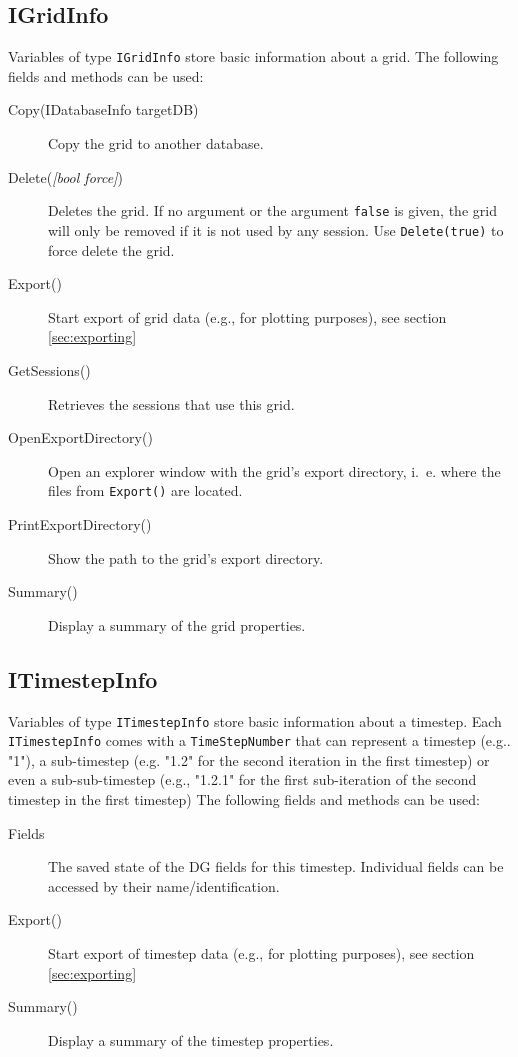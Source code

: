 \subsection{IGridInfo}
Variables of type \lstinline{IGridInfo} store basic information about a grid.
The following fields and methods can be used:
\begin{description}
	\item[Copy(IDatabaseInfo targetDB)]
	Copy the grid to another database.
	
	\item[Delete(\emph{{[}bool force{]}})]
	Deletes the grid. If no argument or the argument \lstinline{false} is given, the grid will only be removed if it is not used by any session. Use \lstinline{Delete(true)} to force delete the grid.
	
	\item[Export()]
	Start export of grid data (e.g., for plotting purposes), see section \ref{sec:exporting}
	
	\item[GetSessions()]
	Retrieves the sessions that use this grid.
	
	\item[OpenExportDirectory()]
	Open an explorer window with the grid's export directory, i.~e. where the files from \lstinline{Export()} are located.
	
	\item[PrintExportDirectory()]
	Show the path to the grid's export directory.

	\item[Summary()]
	Display a summary of the grid properties.
\end{description}

\subsection{ITimestepInfo}
\label{sec:ITimestepInfo}
Variables of type \lstinline{ITimestepInfo} store basic information about a timestep. Each \lstinline{ITimestepInfo} comes with a \lstinline{TimeStepNumber} that can represent a timestep (e.g.. "1"), a sub-timestep (e.g. "1.2" for the second iteration in the first timestep) or even a sub-sub-timestep (e.g., "1.2.1" for the first sub-iteration of the second timestep in the first timestep)
The following fields and methods can be used:
\begin{description}
	\item[Fields]
	The saved state of the DG fields for this timestep. Individual fields can be accessed by their name/identification.
	
	\item[Export()]
	Start export of timestep data (e.g., for plotting purposes), see section \ref{sec:exporting}
	
	\item[Summary()]
	Display a summary of the timestep properties.
\end{description}

